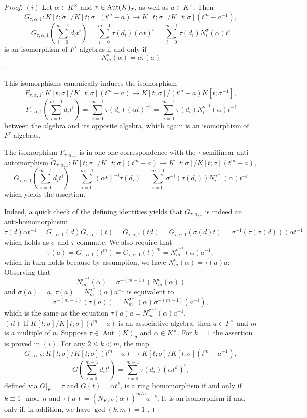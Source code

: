 \documentclass{amsart}
\theoremstyle{plain}
\theoremstyle{definition}
\numberwithin{equation}{section}
\numberwithin{figure}{section}
\DeclareMathOperator{\Aut}{Aut}
\begin{document}
\begin{proof}
$(i)$
Let $\alpha\in K^\times$ and $\tau \in {\rm Aut}(K)_\sigma$, as well as $a\in K^\times$. Then
   $$ G_{\tau,\alpha,1}: K[t;\sigma]/K[t;\sigma](t^m-a)\to K[t;\sigma]/K[t;\sigma](t^m-a^{-1}),$$
   $$G_{\tau,\alpha,1}(\sum_{i=0}^{m-1}d_it^i)=\sum_{i=0}^{m-1}\tau(d_i) (\alpha t)^i= \sum_{i=0}^{m-1}\tau(d_i) N_i^\sigma(\alpha) t^i$$
    is an isomorphism of $F^\tau$-algebras if and only if
$$
N_{m}^\sigma( \alpha)= a\tau(a) $$
\cite[Theorem 4.1]{Pum2025}.

This isomorphisms canonically induces the isomorphism
 $$ F_{\tau,\alpha,1}: K[t;\sigma]/K[t;\sigma](t^m-a)\to K[t;\sigma]/(t^m-a) K[t;\sigma^{-1}],$$
   $$F_{\tau,\alpha,1}(\sum_{i=0}^{m-1}d_it^i)=\sum_{i=0}^{m-1}\tau(d_i) (\alpha t)^{-i}= \sum_{i=0}^{m-1}\tau(d_i) N_i^{\sigma^{-1}}(\alpha) t^{-i}$$
between the algebra and its opposite algebra,  which again  is an isomorphism of $F^\tau$-algebras.

 The isomorphism $F_{\tau,\alpha,1}$ is in one-one correspondence with the  $\tau$-semilinear anti-automorphism
 $\widetilde G_{\tau,\alpha,1}:K[t;\sigma]/K[t;\sigma](t^m-a) \to K[t;\sigma]/K[t;\sigma](t^m-a)$,
 $$\widetilde G_{\tau,\alpha,1}(\sum_{i=0}^{m-1}d_it^i)=\sum_{i=0}^{m-1}(\alpha t)^{-i} \tau(d_i) = \sum_{i=0}^{m-1}\sigma^{-i}(\tau(d_i) ) N_i^{\sigma^{-1}}(\alpha) t^{-i}$$
which yields the assertion.

Indeed, a quick check of the defining identities yields that $\widetilde G_{\tau,\alpha,1}$ is indeed an anti-homomorphism:
$$\tau(d)\alpha t^{-1}=\widetilde G_{\tau,\alpha,1}(d)\widetilde G_{\tau,\alpha,1}(t)=\widetilde G_{\tau,\alpha,1}(td)=\widetilde G_{\tau,\alpha,1}(\sigma(d)t)=\sigma^{-1}(\tau(\sigma(d)))\alpha t^{-1}$$
 which holds as $\sigma$ and $\tau$ commute. We also require that
 $$\tau(a)=\widetilde G_{\tau,\alpha,1}(t^m)=\widetilde G_{\tau,\alpha,1}(t)^m=N_m^{\sigma^{-1}}(\alpha)a^{-1},$$
  which in turn holds because by assumption, we have $N_{m}^\sigma( \alpha)= \tau(a)a$:
 Observing that $$N_m^{\sigma^{-1}}(\alpha)= \sigma^{-(m-1)} (N_m^{\sigma}(\alpha))$$ and $\sigma(a)=a$, $\tau(a)=N_m^{\sigma^{-1}}(\alpha)a^{-1}$ is equivalent to
 $$\sigma^{-(m-1)} (\tau(a))=N_m^{\sigma^{-1}}(\alpha)\sigma^{-(m-1)} (a^{-1}),$$
  which is the same as the equation
$\tau(a)a=N_m^{\sigma^{-1}}(\alpha)a^{-1}$.
\\ $(ii)$ If $K[t;\sigma]/K[t;\sigma](t^m-a)$ is  an associative algebra, then $a\in F^\times$ and $m$ is a multiple of $n$. 
Suppose $\tau\in \Aut(K)_\sigma$ and $\alpha \in K^\times$. For $k=1$ the assertion is proved in $(i)$. For any $2\leq k < m$, the map
    $$
    G_{\tau,\alpha,k}: K[t;\sigma]/K[t;\sigma](t^m-a)\to K[t;\sigma]/K[t;\sigma](t^m-a^{-1}),
    $$
   $$
G ( \sum_{i=0}^{m-1}d_it^i ) = \sum_{i=0}^{m-1}\tau(d_i) (\alpha t^k)^i,
$$
 defined via $G|_{K}=\tau$ and $G(t)=\alpha t^k$,
    is a ring homomorphism if and only if  $k\equiv 1 \mod n$ and $\tau(a)=(N_{K/F}(\alpha))^{m/n}a^{-k}$.
    It is an isomorphism if and only if, in addition, we have $\gcd(k,m)=1$ \cite[Theorem 4.4]{NevPum2025}.


\end{proof}
\end{document}
